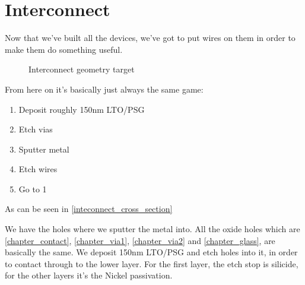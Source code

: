 \section{Interconnect}

Now that we've built all the devices, we've got to put wires on them in order to make them do something useful.

\begin{figure}[H]
	\centering
	\begin{tikzpicture}[node distance = 3cm, auto, thick,scale=\CrossSectionOnly, every node/.style={transform shape}]
		
	\end{tikzpicture}
	\caption{Interconnect geometry target}
	\label{inteconnect_cross_section}
\end{figure}

From here on it's basically just always the same game:
\begin{enumerate}
	\item Deposit roughly 150nm LTO/PSG
	\item Etch vias
	\item Sputter metal
	\item Etch wires
	\item Go to 1
\end{enumerate}

As can be seen in \autoref{inteconnect_cross_section}

We have the holes where we sputter the metal into. All the oxide holes which are \autoref{chapter_contact}, \autoref{chapter_via1}, \autoref{chapter_via2} and \autoref{chapter_glass}, are basically the same.
We deposit 150nm LTO/PSG and etch holes into it, in order to contact through to the lower layer.
For the first layer, the etch stop is silicide, for the other layers it's the Nickel passivation.

\newpage




\newpage




\newpage




\newpage



